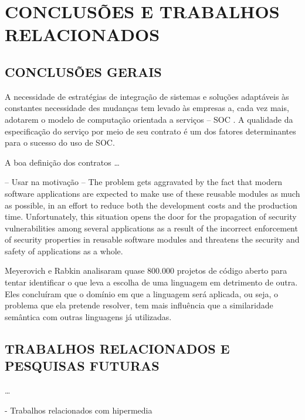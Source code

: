 \chapter{CONCLUSÕES E TRABALHOS RELACIONADOS}
\vspace{-6mm}

\section{CONCLUSÕES GERAIS}
\vspace{-6mm}

A necessidade de estratégias de integração de sistemas e soluções adaptáveis às
constantes necessidade des mudanças tem levado às empresas a, cada vez mais,
adotarem o modelo de computação orientada a serviços -- SOC
\cite{papazoglou2008service} \cite{erl2009web}. A qualidade da especificação do
serviço por meio de seu contrato é um dos fatores determinantes para o sucesso
do uso de SOC.


A boa definição dos contratos \ldots 
\vspace{-6mm}


-- Usar na motivação --
The problem gets aggravated by
the fact that modern software applications are expected to
make use of these reusable modules as much as possible,
in an effort to reduce both the development costs and the
production time. Unfortunately, this situation opens the door
for the propagation of security vulnerabilities among several
applications as a result of the incorrect enforcement of security
properties in reusable software modules and threatens the
security and safety of applications as a whole.
\cite{rubio2013verifying}

Meyerovich e Rabkin \cite{meyerovich2013empirical} analisaram quase 800.000
projetos de código aberto para tentar identificar o que leva a escolha de uma
linguagem em detrimento de outra. Eles concluíram que o domínio em que a
linguagem será aplicada, ou seja, o problema que ela pretende resolver, tem mais
influência que a similaridade semântica com outras linguagens já utilizadas. 
\cite{meyerovich2013empirical}





\section{TRABALHOS RELACIONADOS E PESQUISAS FUTURAS }
\vspace{-6mm}

\ldots

- Trabalhos relacionados com hipermedia
